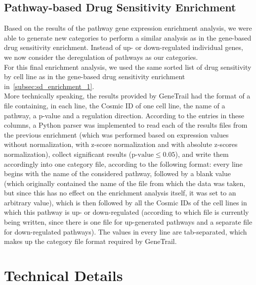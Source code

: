 
\subsection{Pathway-based Drug Sensitivity Enrichment}\label{subsec_sd_enrichment_3}
Based on the results of the pathway gene expression enrichment analysis, we were able to generate new categories to perform a similar analysis as in the gene-based drug sensitivity enrichment. Instead of up- or down-regulated individual genes, we now consider the deregulation of pathways as our categories.\\
For this final enrichment analysis, we used the same sorted list of drug sensitivity by cell line as in the gene-based drug sensitivity enrichment in~\ref{subsec:sd_enrichment_1}.\\
More technically speaking, the results provided by GeneTrail had the format of a file containing, in each line, the Cosmic ID of one cell line, the name of a pathway, a p-value and a regulation direction. According to the entries in these columns, a Python parser was implemented to read each of the results files from the previous enrichment (which was performed based on expression values without normalization, with z-score normalization and with absolute z-scores normalization), collect significant results ($\text{p-value}\leq0.05$), and write them accordingly into one category file, according to the following format: every line begins with the name of the considered pathway, followed by a blank value (which originally contained the name of the file from which the data was taken, but since this has no effect on the enrichment analysis itself, it was set to an arbitrary value), which is then followed by all the Cosmic IDs of the cell lines in which this pathway is up- or down-regulated (according to which file is currently being written, since there is one file for up-generated pathways and a separate file for down-regulated pathways). The values in every line are tab-separated, which makes up the category file format required by GeneTrail.

\section{Technical Details}\label{sec:technical_details}

